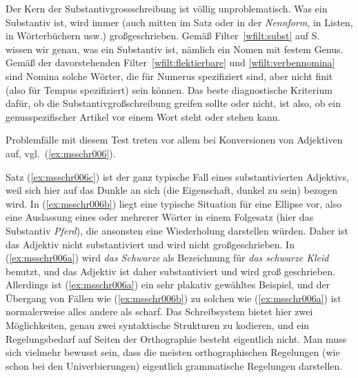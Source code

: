 
Der Kern der Substantivgrossschreibung ist völlig unproblematisch.
Was ein Substantiv ist, wird immer (auch mitten im Satz oder in der \textit{Nennform}, in Listen, in Wörterbüchern usw.) großgeschrieben.
Gemäß Filter~\ref{wfilt:subst} auf S.~\pageref{wfilt:subst} wissen wir genau, was ein Substantiv ist, nämlich ein Nomen mit festem Genus.
Gemäß der davorstehenden Filter~\ref{wfilt:flektierbare} und \ref{wfilt:verbennomina} sind Nomina solche Wörter, die für Numerus spezifiziert sind, aber nicht finit (also für Tempus spezifiziert) sein können.
Das beste diagnostische Kriterium dafür, ob die Substantivgroßschreibung greifen sollte oder nicht, ist also, ob ein genusspezifischer Artikel vor einem Wort steht oder stehen kann.

Problemfälle mit diesem Test treten vor allem bei Konversionen von Adjektiven auf, vgl.\ (\ref{ex:msschr006}).

\begin{exe}
  \ex\label{ex:msschr006} 
  \begin{xlist}
  \end{xlist}
\end{exe}

Satz (\ref{ex:msschr006c}) ist der ganz typische Fall eines substantivierten Adjektivs, weil sich hier auf das Dunkle an sich (die Eigenschaft, dunkel zu sein) bezogen wird.
In (\ref{ex:msschr006b}) liegt eine typische Situation für eine Ellipse vor, also eine Auslassung eines oder mehrerer Wörter in einem Folgesatz (hier das Substantiv \textit{Pferd}), die ansonsten eine Wiederholung darstellen würden.
Daher ist das Adjektiv nicht substantiviert und wird nicht großgeschrieben.
In (\ref{ex:msschr006a}) wird \textit{das Schwarze} als Bezeichnung für \textit{das schwarze Kleid} benutzt, und das Adjektiv ist daher substantiviert und wird groß geschrieben.
Allerdings ist (\ref{ex:msschr006a}) ein sehr plakativ gewähltes Beispiel, und der Übergang von Fällen wie (\ref{ex:msschr006b}) zu solchen wie (\ref{ex:msschr006a}) ist normalerweise alles andere als scharf.
Das Schreibsystem bietet hier zwei Möglichkeiten, genau zwei syntaktische Strukturen zu kodieren, und ein Regelungsbedarf auf Seiten der Orthographie besteht eigentlich nicht.
Man muss sich vielmehr bewusst sein, dass die meisten orthographischen Regelungen (wie schon bei den Univerbierungen) eigentlich grammatische Regelungen darstellen.

